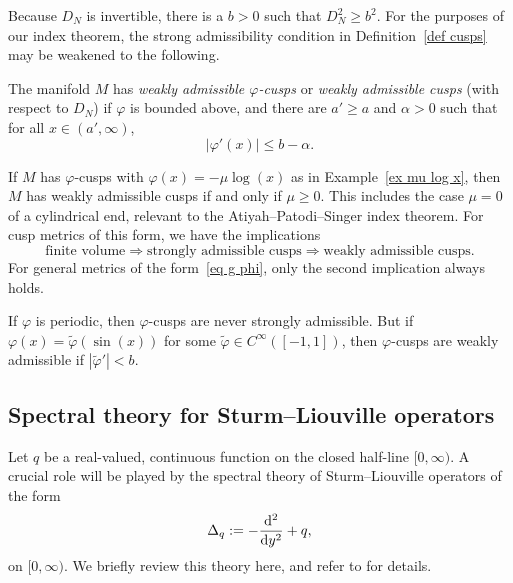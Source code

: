 \documentclass[pdftex]{sigma}%
\numberwithin{equation}{section}
\begin{document}
Because $D_N$ is invertible, there is a $b>0$ such that $D_N^2 \geq b^2$. For the purposes of our index theorem, the strong admissibility condition in Definition~\ref{def cusps} may be weakened to the following.
\begin{Definition}\label{def weakly adm}
The manifold $M$ has \emph{weakly admissible $\varphi$-cusps} or \emph{weakly admissible cusps} (with respect to $D_N$) if $\varphi$ is bounded above, and there are $a'\geq a$ and $\alpha>0$ such that for all $x \in (a', \infty)$,
\begin{equation} \label{eq bound phi' b}
|\varphi'(x)| \leq b - \alpha.
\end{equation}
\end{Definition}
\begin{Example}
If $M$ has $\varphi$-cusps with $\varphi(x) = -\mu\log(x)$ as in Example~\ref{ex mu log x}, then $M$ has weakly admissible cusps if and only if $\mu \geq 0$. This includes the case $\mu=0$ of a cylindrical end, relevant to the Atiyah--Patodi--Singer index theorem. For cusp metrics of this form, we have the implications
\[
\text{finite volume} \Rightarrow \text{strongly admissible cusps} \Rightarrow \text{weakly admissible cusps}.
\]
For general metrics of the form~\eqref{eq g phi}, only the second implication always holds.
\end{Example}

\begin{Example}
If $\varphi$ is periodic, then $\varphi$-cusps are never strongly admissible. But if $\varphi(x) = \tilde \varphi(\sin(x))$ for some $\tilde \varphi \in C^{\infty}([-1,1])$, then $\varphi$-cusps are weakly admissible if $|\tilde \varphi'| < b$.
\end{Example}

\subsection{Spectral theory for Sturm--Liouville operators}

Let $q$ be a real-valued, continuous function on the closed half-line $[0, \infty)$.
A crucial role will be played by the spectral theory of Sturm--Liouville operators of the form
\[
\Delta_{q}:= -\frac{{\rm d}^2}{{\rm d}y^2} + q,
\]
on $[0, \infty)$.
We briefly review this theory here, and refer to \cite{Levitan91, Titchmarsh62} for details.
\end{document}
